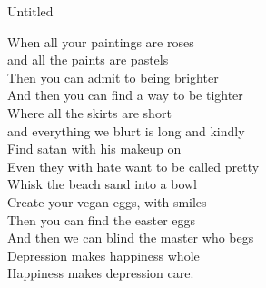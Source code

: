Untitled

When all your paintings are roses\\
and all the paints are pastels\\
Then you can admit to being brighter\\
And then you can find a way to be tighter\\

Where all the skirts are short\\
and everything we blurt is long and kindly\\
Find satan with his makeup on\\
Even they with hate want to be called pretty\\

Whisk the beach sand into a bowl\\
Create your vegan eggs, with smiles\\
Then you can find the easter eggs\\
And then we can blind the master who begs\\

Depression makes happiness whole\\
Happiness makes depression care.\\

